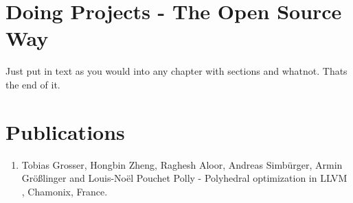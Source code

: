 \documentclass[MTech]{iitmdiss}
\begin{document}
\chapter{Doing Projects - The Open Source Way}
 
 Just put in text as you would into any chapter with sections and
 whatnot.  Thats the end of it.


\chapter*{Publications}
\vspace{-0.3cm}

\begin{enumerate}
\item Tobias Grosser, Hongbin Zheng, Raghesh Aloor, Andreas Simb{\"u}rger, Armin {G}r{\"o}{\ss}linger and Louis-No{\"e}l Pouchet \newblock
  Polly - Polyhedral optimization in LLVM , Chamonix, France.
\end{enumerate}


\pagebreak
\begin{singlespace}
  \begin{small}
	
%
  \end{small}
\end{singlespace}

\end{document}
